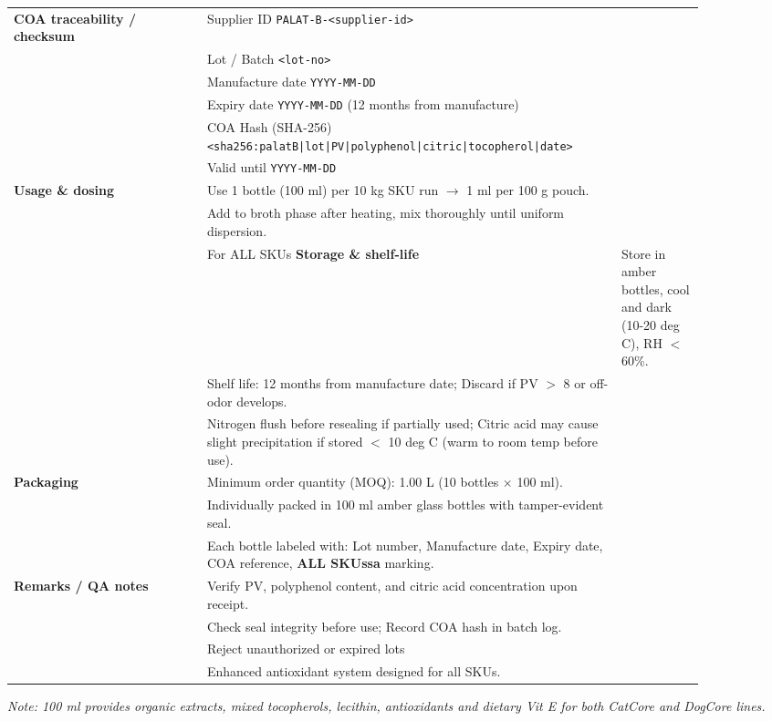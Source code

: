 \begin{adjustbox}{max width=\textwidth}
\begin{tabular}{@{}p{0.28\linewidth}p{0.60\linewidth}@{}}
\midrule
\textbf{COA traceability / checksum} &
Supplier ID \dotfill \texttt{PALAT-B-<supplier-id>}\\
& Lot / Batch \dotfill \texttt{<lot-no>}\\
& Manufacture date \dotfill \texttt{YYYY-MM-DD}\\
& Expiry date \dotfill \texttt{YYYY-MM-DD} (12 months from manufacture)\\
& COA Hash (SHA-256) \dotfill \texttt{<sha256:palatB|lot|PV|polyphenol|citric|tocopherol|date>}\\
& Valid until \dotfill \texttt{YYYY-MM-DD}\\
\midrule
\textbf{Usage \& dosing} &
Use 1 bottle (100 ml) per 10 kg SKU run $\rightarrow$ 1 ml per 100 g pouch.\\
& Add to broth phase after heating, mix thoroughly until uniform dispersion.\\
& For ALL SKUs
\midrule
\textbf{Storage \& shelf-life} &
Store in amber bottles, cool and dark (10-20 deg C), RH $<$ 60\%.\\
& Shelf life: 12 months from manufacture date; Discard if PV $>$ 8 or off-odor develops.\\
& Nitrogen flush before resealing if partially used; Citric acid may cause slight precipitation if stored $<$ 10 deg C (warm to room temp before use).\\
\midrule
\textbf{Packaging} &
Minimum order quantity (MOQ): 1.00 L (10 bottles $\times$ 100 ml).\\
& Individually packed in 100 ml amber glass bottles with tamper-evident seal.\\
& Each bottle labeled with: Lot number, Manufacture date, Expiry date, COA reference, \textbf{ALL SKUssa} marking.\\
\midrule
\textbf{Remarks / QA notes} &
Verify PV, polyphenol content, and citric acid concentration upon receipt.\\
& Check seal integrity before use; Record COA hash in batch log.\\
& Reject unauthorized or expired lots\\
& Enhanced antioxidant system designed for all SKUs.\\
\bottomrule
\end{tabular}\end{adjustbox}

\vspace{0.5em}
\noindent\textit{Note: 100 ml provides organic extracts, mixed tocopherols, lecithin, antioxidants and dietary Vit E for both CatCore and DogCore lines.}
\vspace{0.5em}
